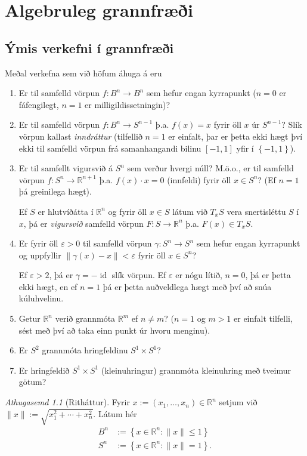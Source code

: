 \documentclass[a4paper,icelandic]{book}
\theoremstyle{definition}
\theoremstyle{plain}
\theoremstyle{remark}
\newtheorem*{ath}{Athugasemd}
\newcommand{\R}{\mathbb{R}} %
\DeclareMathOperator{\id}{id} %
\begin{document}
\part{Algebruleg grannfræði}
\chapter{Ýmis verkefni í grannfræði}
Meðal verkefna sem við höfum áhuga á eru
\begin{enumerate}
  \item Er til samfelld vörpun $f:B^n\to B^n$ sem hefur engan kyrrapunkt
    ($n=0$ er fáfengilegt, $n=1$ er milligildissetningin)?
  \item Er til samfelld vörpun $f:B^n \to S^{n-1}$ þ.a. $f(x) = x$ fyrir
    öll $x$ úr $S^{n-1}$? Slík vörpun kallast
    \emph{inndráttur} (tilfellið $n=1$ er einfalt,
    þar er þetta ekki hægt því ekki til samfelld vörpun frá
    samanhangandi bilinu $\left[ -1,1 \right]$ yfir í $\left\{ -1,1
    \right\}$).
  \item Er til samfellt vigursvið á $S^n$ sem verður hvergi núll?
    M.ö.o., er til samfelld vörpun $f:S^n \to \R^{n+1}$ þ.a. $f(x)\cdot
    x = 0$ (innfeldi) fyrir öll $x\in S^n$? (Ef $n=1$ þá greinilega
    hægt). 

    Ef $S$ er hlutvíðátta í $\R^n$ og fyrir öll $x\in S$ látum við $T_x
    S$ vera snertisléttu $S$ í $x$, þá er
    \emph{vigursvið} samfelld vörpun $F:S\to\R^n$ þ.a.
    $F(x)\in T_x S$.
  \item Er fyrir öll $\varepsilon>0$ til samfelld vörpun
    $\gamma:S^n\to S^n$ sem hefur engan kyrrapunkt og uppfyllir
    $\|\gamma(x)-x\|<\varepsilon$ fyrir öll $x\in S^n$?

    Ef $\varepsilon>2$, þá er $\gamma = -\id$ slík vörpun. Ef
    $\varepsilon$ er nógu lítið, $n=0$, þá er þetta ekki hægt, en ef
    $n=1$ þá er þetta auðveldlega hægt með því að snúa kúluhvelinu.
  \item Getur $\R^n$ verið grannmóta $\R^m$ ef $n\neq m$? ($n=1$ og
    $m>1$ er einfalt tilfelli, sést með því að taka einn punkt úr hvoru
    menginu).
  \item Er $S^2$ grannmóta hringfeldinu $S^1\times S^1$?
  \item Er hringfeldið $S^1\times S^1$ (kleinuhringur) grannmóta
    kleinuhring með tveimur götum? 
\end{enumerate}
\begin{ath}
  [Ritháttur]
  Fyrir $x:=(x_1,\dots,x_n)\in\R^n$ setjum við
  $\|x\|:=\sqrt{x_1^2+\cdots+x_n^2}$. Látum hér 
  \begin{align*}
    B^n &:= \left\{ x\in\R^n : \|x\|\leq 1 \right\}\\
    S^n &:= \left\{ x\in\R^n : \|x\|   = 1 \right\}.
  \end{align*}
\end{ath}
\end{document}
